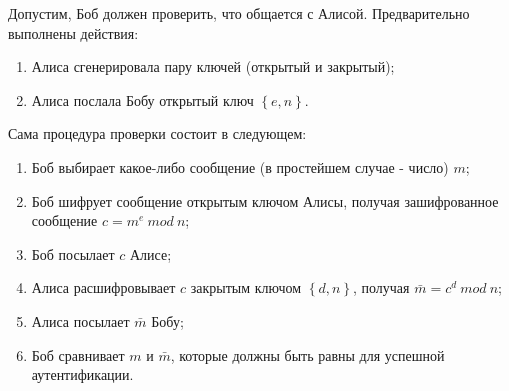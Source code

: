Допустим, Боб должен проверить, что общается с Алисой. Предварительно выполнены действия:

\begin{enumerate}
\item Алиса сгенерировала пару ключей (открытый и закрытый);
\item Алиса послала Бобу открытый ключ $\left\{e,n\right\}$.
\end{enumerate}


Сама процедура проверки состоит в следующем:

\begin{enumerate}
\item Боб выбирает какое-либо сообщение (в простейшем случае \-- число) $m$;
\item Боб шифрует сообщение открытым ключом Алисы, получая зашифрованное сообщение
        $c = m^e \ mod \ n$;
\item Боб посылает $c$ Алисе;
\item Алиса расшифровывает $c$ закрытым ключом $\left\{d,n\right\}$, получая $\bar{m} = c^d \ mod \ n$;
\item Алиса посылает $\bar{m}$ Бобу;
\item Боб сравнивает $m$ и $\bar{m}$, которые должны быть равны для успешной аутентификации.

\end{enumerate}
